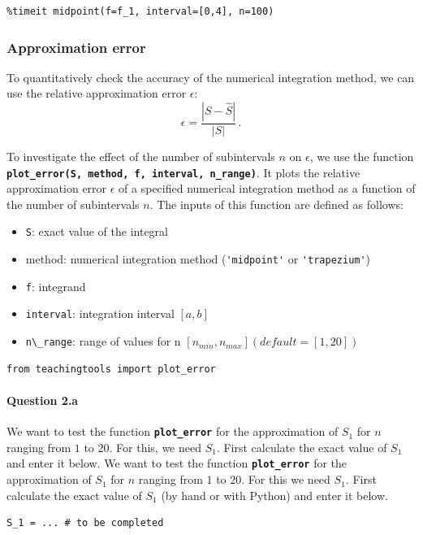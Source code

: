 \begin{lstlisting}
%timeit midpoint(f=f_1, interval=[0,4], n=100)
\end{lstlisting}


\subsubsection{Approximation error}\label{pc:integratie_eps}
To quantitatively check the accuracy of the numerical integration method, we can use the relative approximation error $\epsilon$:
$$
\epsilon = \dfrac{|S-\hat{S}|}{|S|}\,.
$$

To investigate the effect of the number of subintervals $n$ on $\epsilon$, we use the  function \\ \textbf{\lstinline|plot_error(S, method, f, interval, n_range)|}. It
plots the relative approximation error $\epsilon$ of a specified numerical integration method as a function of the number of subintervals $n$. The inputs of this function are defined as follows:
\begin{itemize}
	\item \lstinline|S|:  exact value of the integral
	\item method: numerical integration method (\lstinline|'midpoint'| or \lstinline|'trapezium'|)
	\item \lstinline|f|:  integrand
	\item \lstinline|interval|:  integration interval $[a,b]$
	\item \lstinline|n\_range|: range of values for n $[n_{min},n_{max}] \left(default = [1,20] \right)$
\end{itemize}


\begin{lstlisting}
from teachingtools import plot_error
\end{lstlisting}


\paragraph{Question 2.a}
\ifmathematica
We want to test the function \textbf{\lstinline|plot_error|} for the approximation of $S_1$ for $n$ ranging from $1$ to $20$. For this, we need $S_1$. First calculate the exact value of $S_1$ and enter it below.
\fi
\ifpython
We want to test the function \textbf{\lstinline|plot_error|} for the approximation of $S_1$ for $n$ ranging from $1$ to $20$. For this we need $S_1$. First calculate the exact value of $S_1$ (by hand or with Python) and enter it below.
\fi
\begin{lstlisting}
S_1 = ... # to be completed
\end{lstlisting}


